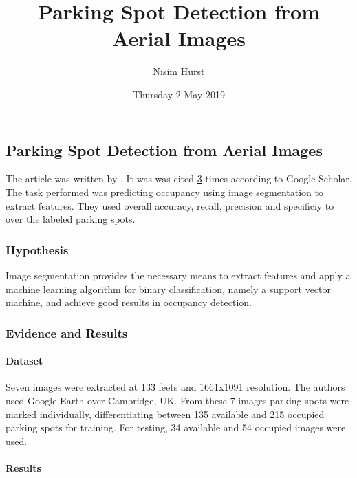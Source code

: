 \documentclass[]{article}
\title{Parking Spot Detection from Aerial Images}
\author{\href{mailto:langheran@gmail.com}{Nisim Hurst}}
\date{Thursday 2 May 2019}
\let\oldparagraph\paragraph
\renewcommand{\paragraph}[1]{\oldparagraph{#1}\mbox{}}
\begin{document}
\maketitle

\label{toc}

\hypertarget{parking-spot-detection-from-aerial-images}{%
\subsection{Parking Spot Detection from Aerial Images}\label{parking-spot-detection-from-aerial-images}}

The article was written by \autocite{kabak2010parking}. It was was cited \href{https://scholar.google.com/scholar?cites=6373615407951726768\&as_sdt=2005\&sciodt=0,5\&hl=en}{3} times according to Google Scholar. The task performed was predicting occupancy using image segmentation to extract features. They used overall accuracy, recall, precision and specificiy to over the labeled parking spots.

\hypertarget{hypothesis}{%
\subsubsection{Hypothesis}\label{hypothesis}}

Image segmentation provides the necessary means to extract features and apply a machine learning algorithm for binary classification, namely a support vector machine, and achieve good results in occupancy detection.

\hypertarget{evidence-and-results}{%
\subsubsection{Evidence and Results}\label{evidence-and-results}}

\hypertarget{dataset}{%
\paragraph{Dataset}\label{dataset}}

Seven images were extracted at 133 feets and 1661x1091 resolution. The authors used Google Earth over Cambridge, UK. From these 7 images parking spots were marked individually, differentiating between 135 available and 215 occupied parking spots for training. For testing, 34 available and 54 occupied images were used.

\hypertarget{results}{%
\paragraph{Results}\label{results}}
\end{document}
